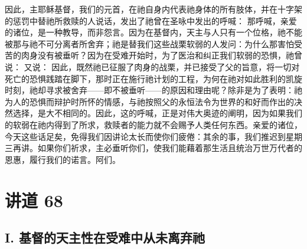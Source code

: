 因此，主耶稣基督，我们的元首，在祂自身内代表祂身体的所有肢体，并在十字架的惩罚中替祂所救赎的人说话，发出了祂曾在圣咏中发出的呼喊： 那呼喊，亲爱的诸位，是一种教导，而非怨言。因为在基督内，天主与人只有一个位格，祂不能被那与祂不可分离者所舍弃；祂是替我们这些战栗软弱的人发问：为什么那害怕受苦的肉身没有被垂听？因为在受难开始时，为了医治和纠正我们软弱的恐惧，祂曾说： 又说：  因此，既然祂已征服了肉身的战栗，并已接受了父的旨意，将一切对死亡的恐惧践踏在脚下，那时正在施行祂计划的工程，为何在祂对如此胜利的凯旋时刻，祂却寻求被舍弃——即不被垂听——的原因和理由呢？除非是为了表明：祂为人的恐惧而辩护时所怀的情感，与祂按照父的永恒法令为世界的和好而作出的决然选择，是大不相同的。因此，这的呼喊，正是对伟大奥迹的阐明，因为如果我们的软弱在祂内得到了所求，救赎者的能力就不会赐予人类任何东西。亲爱的诸位，今天这些话足矣，免得我们因讲论太长而使你们疲倦：其余的事，我们推迟到星期三再讲。如果你们祈求，主必垂听你们，使我们能藉着那生活且统治万世万代者的恩惠，履行我们的诺言。阿们。\par



\section{讲道 68}

\par


\subsection{I. 基督的天主性在受难中从未离弃祂}

